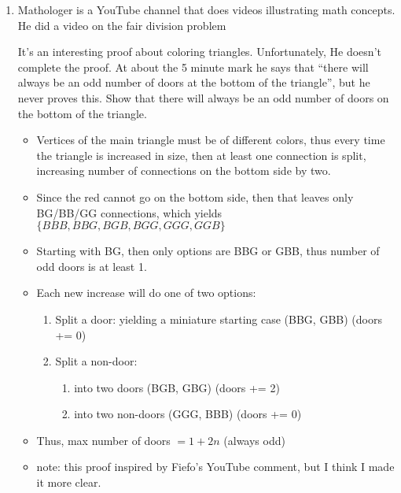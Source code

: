 \documentclass[basic, header]{nosvagor-notes}
\begin{document}
\begin{enumerate}[itemsep=5em]
    \item Mathologer is a YouTube channel that does videos illustrating math
      concepts. He did a video on the fair division problem
      \begin{center}
      \end{center}

      It's an interesting proof about coloring triangles. Unfortunately, He
      doesn't complete the proof. At about the 5 minute mark he says that
      ``there will always be an odd number of doors at the bottom of the
      triangle'',  but he never proves this. Show that there will always be an
      odd number of doors on the bottom of the triangle.

      \begin{itemize}
        \item Vertices of the main triangle must be of different colors, thus every
          time the triangle is increased in size, then at least one connection
          is split, increasing number of connections on the bottom side by two.
        \item Since the red cannot go on the bottom side, then that leaves only
          BG/BB/GG connections, which yields \(\{ BBB, BBG, BGB, BGG, GGG, GGB \}\)
        \item Starting with BG, then only options are BBG or GBB, thus number of odd doors is at least 1.
        \item Each new increase will do one of two options:
          \begin{enumerate}[leftmargin=2em]
            \item Split a door: yielding a miniature starting case (BBG, GBB) (doors += 0)

            \item Split a non-door:
              \begin{enumerate}
                \item into two doors (BGB, GBG) (doors += 2)
                \item into two non-doors (GGG, BBB) (doors += 0)
              \end{enumerate}

          \end{enumerate}
        \item Thus, max number of doors \(= 1 + 2n\) (always odd)

        \item note: this proof inspired by Fiefo's YouTube comment, but I think I
          made it more clear.
      \end{itemize}


\end{enumerate}
\end{document}
